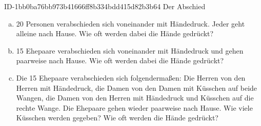 \begin{exercise}
      {ID-1bb0ba76bb973b41666ff8b334bdd415d82b3b64}
      {Der Abschied}
  \ifproblem\problem
    \begin{enumerate}[a)]
      \item 20 Personen verabschieden sich voneinander mit Händedruck. Jeder
            geht alleine nach Hause. Wie oft werden dabei die Hände gedrückt?
      \item 15 Ehepaare verabschieden sich voneinander mit Händedruck und gehen
            paarweise nach Hause. Wie oft werden dabei die Hände gedrückt?
      \item Die 15 Ehepaare verabschieden sich folgendermaßen: Die Herren von
            den Herren mit Händedruck, die Damen von den Damen mit Küsschen auf
            beide Wangen, die Damen von den Herren mit Händedruck und Küsschen
            auf die rechte Wange. Die Ehepaare gehen wieder paarweise nach Hause.
            Wie viele Küsschen werden gegeben? Wie oft werden die Hände gedrückt?
    \end{enumerate}
  \fi
\end{exercise}
